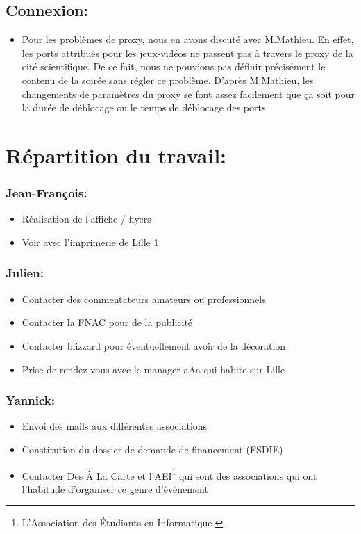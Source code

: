 \subsection{Connexion:}
\begin{itemize}
\item Pour les problèmes de proxy, nous en avons discuté avec M.Mathieu. En effet, les ports attribués pour les jeux-vidéos ne passent pas à travers le proxy de la cité scientifique. De ce fait, nous ne pouvions pas définir précisément le contenu de la soirée sans régler ce problème. D'après M.Mathieu, les changements de paramètres du proxy se font assez facilement que ça soit pour la durée de déblocage ou le temps de déblocage des ports
\end{itemize}

\section{Répartition du travail:}

\subsubsection{Jean-François:}
\begin{itemize}
\item Réalisation de l'affiche / flyers
\item Voir avec l'imprimerie de Lille 1
\end{itemize}

\subsubsection{Julien:}
\begin{itemize}
\item Contacter des commentateurs amateurs ou professionnels
\item Contacter la FNAC pour de la publicité
\item Contacter blizzard pour éventuellement avoir de la décoration
\item Prise de rendez-vous avec le manager aAa qui habite sur Lille
\end{itemize}

\subsubsection{Yannick:}
\begin{itemize}
\item Envoi des mails aux différentes associations
\item Constitution du dossier de demande de financement (FSDIE)
\item Contacter \og Des À La Carte \fg{} et l'AEI\footnote{L'Association des Étudiants en Informatique.} qui sont des associations qui ont l'habitude d'organiser ce genre d’événement
\end{itemize}
